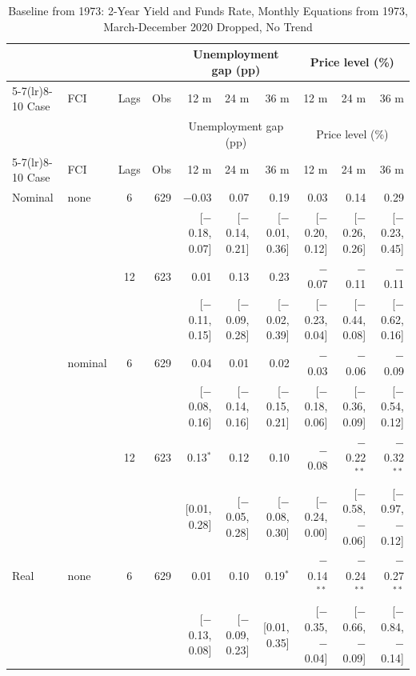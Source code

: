 \begingroup\scriptsize\setlength{\tabcolsep}{0.9pt}
\begin{longtable}{llcrrrrrrr}
\caption{Baseline from 1973: 2-Year Yield and Funds Rate, Monthly Equations from 1973, March-December 2020 Dropped, No Trend}\label{tab:appB73}\\
\toprule
 & & & & \multicolumn{3}{c}{Unemployment gap (pp)} & \multicolumn{3}{c}{Price level (\%)}\\ \cmidrule(lr){5-7}\cmidrule(lr){8-10}
Case & FCI & Lags & Obs & 12 m & 24 m & 36 m & 12 m & 24 m & 36 m\\
\midrule\endfirsthead
\toprule
 & & & & \multicolumn{3}{c}{Unemployment gap (pp)} & \multicolumn{3}{c}{Price level (\%)}\\ \cmidrule(lr){5-7}\cmidrule(lr){8-10}
Case & FCI & Lags & Obs & 12 m & 24 m & 36 m & 12 m & 24 m & 36 m\\
\midrule\endhead
\bottomrule\endfoot
Nominal & none & 6 & 629 & $-$0.03 & 0.07 & 0.19 & 0.03 & 0.14 & 0.29\\
 & & & & {\scriptsize [$-$0.18, 0.07]} & {\scriptsize [$-$0.14, 0.21]} & {\scriptsize [$-$0.01, 0.36]} & {\scriptsize [$-$0.20, 0.12]} & {\scriptsize [$-$0.26, 0.26]} & {\scriptsize [$-$0.23, 0.45]}\\
 &  & 12 & 623 & 0.01 & 0.13 & 0.23 & $-$0.07 & $-$0.11 & $-$0.11\\
 & & & & {\scriptsize [$-$0.11, 0.15]} & {\scriptsize [$-$0.09, 0.28]} & {\scriptsize [$-$0.02, 0.39]} & {\scriptsize [$-$0.23, 0.04]} & {\scriptsize [$-$0.44, 0.08]} & {\scriptsize [$-$0.62, 0.16]}\\
 & nominal & 6 & 629 & 0.04 & 0.01 & 0.02 & $-$0.03 & $-$0.06 & $-$0.09\\
 & & & & {\scriptsize [$-$0.08, 0.16]} & {\scriptsize [$-$0.14, 0.16]} & {\scriptsize [$-$0.15, 0.21]} & {\scriptsize [$-$0.18, 0.06]} & {\scriptsize [$-$0.36, 0.09]} & {\scriptsize [$-$0.54, 0.12]}\\
 &  & 12 & 623 & 0.13$^{*}$ & 0.12 & 0.10 & $-$0.08 & $-$0.22$^{**}$ & $-$0.32$^{**}$\\
 & & & & {\scriptsize [0.01, 0.28]} & {\scriptsize [$-$0.05, 0.28]} & {\scriptsize [$-$0.08, 0.30]} & {\scriptsize [$-$0.24, 0.00]} & {\scriptsize [$-$0.58, $-$0.06]} & {\scriptsize [$-$0.97, $-$0.12]}\\
\addlinespace
Real & none & 6 & 629 & 0.01 & 0.10 & 0.19$^{*}$ & $-$0.14$^{**}$ & $-$0.24$^{**}$ & $-$0.27$^{**}$\\
 & & & & {\scriptsize [$-$0.13, 0.08]} & {\scriptsize [$-$0.09, 0.23]} & {\scriptsize [0.01, 0.35]} & {\scriptsize [$-$0.35, $-$0.04]} & {\scriptsize [$-$0.66, $-$0.09]} & {\scriptsize [$-$0.84, $-$0.14]}\\

\end{longtable}
